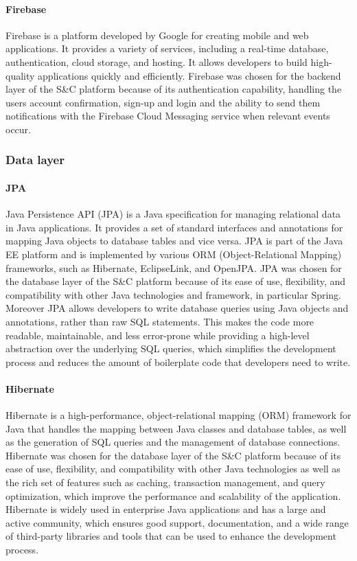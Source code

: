 \paragraph{Firebase}
Firebase is a platform developed by Google for creating mobile and web applications. It provides a variety of services, including a real-time database, authentication, cloud storage, and hosting.  It allows developers to build high-quality applications quickly and efficiently. Firebase was chosen for the backend layer of the S\&C platform because of its authentication capability, handling the users account confirmation, sign-up and login and the ability to send them notifications with the Firebase Cloud Messaging service when relevant events occur. 
\subsubsection{Data layer}
\paragraph{JPA}
Java Persistence API (JPA) is a Java specification for managing relational data in Java applications. It provides a set of standard interfaces and annotations for mapping Java objects to database tables and vice versa. JPA is part of the Java EE platform and is implemented by various ORM (Object-Relational Mapping) frameworks, such as Hibernate, EclipseLink, and OpenJPA. JPA was chosen for the database layer of the S\&C platform because of its ease of use, flexibility, and compatibility with other Java technologies and framework, in particular Spring. 
Moreover JPA  allows developers to write database queries using Java objects and annotations, rather than raw SQL statements. This makes the code more readable, maintainable, and less error-prone while providing a high-level abstraction over the underlying SQL queries, which simplifies the development process and reduces the amount of boilerplate code that developers need to write.

\paragraph{Hibernate}
Hibernate is a high-performance, object-relational mapping (ORM) framework for Java that handles the mapping between Java classes and database tables, as well as the generation of SQL queries and the management of database connections. Hibernate was chosen for the database layer of the S\&C platform because of its ease of use, flexibility, and compatibility with other Java technologies as well as the rich set of features such as caching, transaction management, and query optimization, which improve the performance and scalability of the application. \\
Hibernate is widely used in enterprise Java applications and has a large and active community, which ensures good support, documentation, and a wide range of third-party libraries and tools that can be used to enhance the development process.

